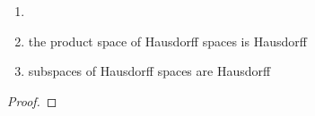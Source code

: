 \begin{thm}\label{thm:17.11}
  \begin{enumerate}[label=(\roman*)]
  \item
  \item
    the product space of Hausdorff spaces is Hausdorff
  \item
    subspaces of Hausdorff spaces are Hausdorff
  \end{enumerate}
\end{thm}
\begin{proof}
\end{proof}
